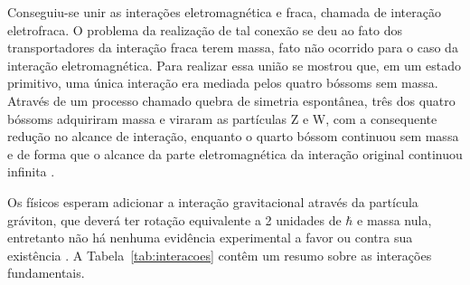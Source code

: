 \begin{table}
\centering
{}
\caption{As quatro interações fundamentais. A intensidade relativa se dá em
relação a interação forte. Adaptado de \cite{Beiser}.}
\end{table}

Conseguiu-se unir as interações eletromagnética e fraca, chamada de interação
eletrofraca. O problema da realização de tal conexão se deu ao fato dos
transportadores da interação fraca terem massa, fato não ocorrido para o caso da
interação eletromagnética. Para realizar essa união se mostrou que, em um
estado primitivo, uma única interação era mediada pelos quatro bóssoms sem massa.
Através de um processo chamado quebra de simetria espontânea, três dos quatro
bóssoms adquiriram massa e viraram as partículas Z e W, com a consequente
redução no alcance de interação, enquanto o quarto bóssom continuou sem massa e
de forma que o alcance da parte eletromagnética da interação original continuou infinita
\cite{Beiser}.


Os físicos esperam adicionar a interação gravitacional
através da partícula gráviton, que deverá ter rotação equivalente a 2
unidades de $\hbar$ e massa nula, entretanto não há nenhuma evidência 
experimental a favor ou contra sua existência \cite{Beiser}.
A Tabela~\ref{tab:interacoes} contêm um resumo sobre as interações
fundamentais.



